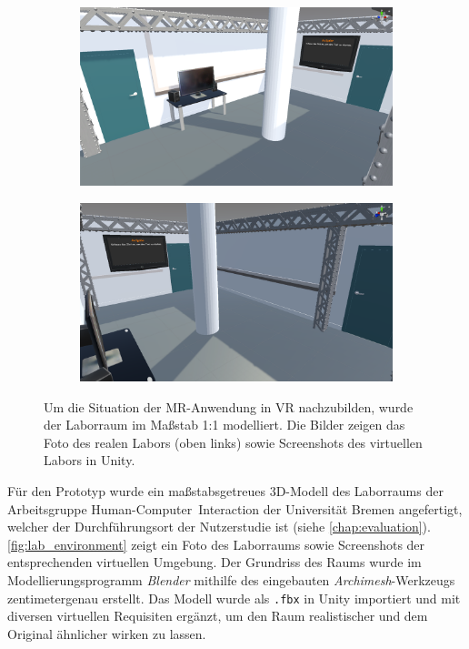 \begin{figure}[b!]
    \begin{subfigure}{0.5\textwidth}
        \includegraphics[width=\textwidth]{figures/lab1}
        \label{sfig:lab_screenshot_2}
    \end{subfigure}%
    \begin{subfigure}{0.5\textwidth}
        \includegraphics[width=\textwidth]{figures/lab2}
        \label{sfig:lab_screenshot_3}
    \end{subfigure}
    \caption{Um die Situation der MR-Anwendung in VR nachzubilden, wurde der Laborraum im Maßstab 1:1 modelliert. %
        Die Bilder zeigen das Foto des realen Labors (oben links) sowie Screenshots des virtuellen Labors in Unity.}
    \label{fig:lab_environment}
\end{figure}

Für den Prototyp wurde ein maßstabsgetreues 3D-Modell des Laborraums der Arbeitsgruppe Human-Computer~Interaction der Universität Bremen angefertigt, welcher der Durchführungsort der Nutzerstudie ist (siehe \autoref{chap:evaluation}).
\autoref{fig:lab_environment} zeigt ein Foto des Laborraums sowie Screenshots der entsprechenden virtuellen Umgebung.
Der Grundriss des Raums wurde im Modellierungsprogramm \emph{Blender} mithilfe des eingebauten \emph{Archimesh}-Werkzeugs zentimetergenau erstellt.
Das Modell wurde als \texttt{.fbx} in Unity importiert und mit diversen virtuellen Requisiten ergänzt, um den Raum realistischer und dem Original ähnlicher wirken zu lassen.

